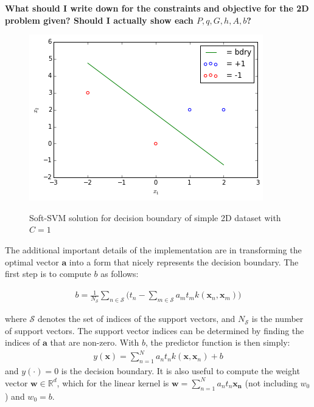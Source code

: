 \documentclass[10pt]{article}
\begin{document}
\textbf{What should I write down for the constraints and objective for the 2D problem given?  Should I actually show each $P,q,G,h,A,b$?}



\begin{figure}
\centering
\includegraphics[scale=0.5]{svm_toy.png}
\label{svm_toy}
\caption{Soft-SVM solution for decision boundary of simple 2D dataset with $C=1$}
\end{figure}

The additional important details of the implementation are in transforming the optimal vector $\mathbf{a}$ into a form that nicely represents the decision boundary.  The first step is to compute $b$ as follows:

\begin{equation}
\begin{aligned}
b = \frac{1}{N_\mathcal{S}} \sum_{n \in \mathcal{S}} \bigg(t_n  - \sum_{m \in \mathcal{S}} a_mt_mk(\mathbf{x}_n, \mathbf{x}_m) \bigg)
\end{aligned}
\end{equation}

where $\mathcal{S}$ denotes the set of indices of the support vectors, and $N_{\mathcal{S}}$ is the number of support vectors.  The support vector indices can be determined by finding the indices of $\mathbf{a}$ that are non-zero. With $b$, the predictor function is then simply: 
\begin{equation}
\begin{aligned}
y(\mathbf{x}) = \sum_{n=1}^N a_nt_nk(\mathbf{x},\mathbf{x}_n) + b
\end{aligned}
\end{equation}
and $y(\cdot)=0$ is the decision boundary.  It is also useful to compute the weight vector $\mathbf{w} \in \mathbb{R}^d$, which for the linear kernel is $\mathbf{w} = \sum_{n=1}^{N} a_n t_n \mathbf{x_n} $ (not including $w_0$) and $w_0 = b$.
\end{document}
